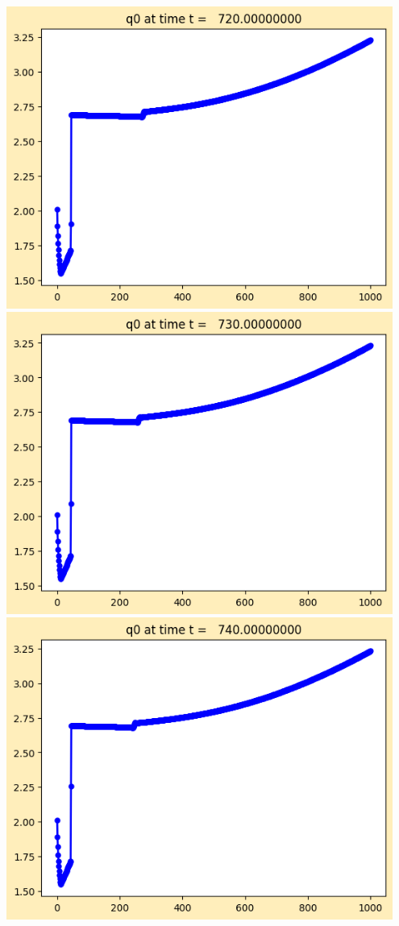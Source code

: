 \documentclass[11pt]{article}
\begin{document}
\vskip 10pt 
\includegraphics[width=0.95\textwidth]{frame0072fig1.png}
\vskip 10pt 
\includegraphics[width=0.95\textwidth]{frame0073fig1.png}
\vskip 10pt 
\includegraphics[width=0.95\textwidth]{frame0074fig1.png}
\end{document}
